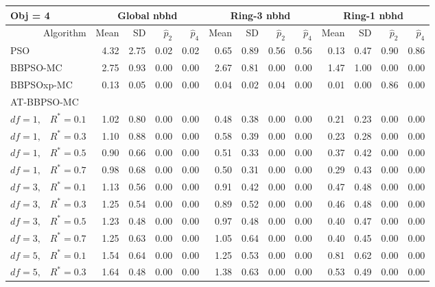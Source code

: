 \documentclass[12pt]{article}
\begin{document}
\begin{table}[ht]
\centering
\footnotesize{
\begin{tabular}{r|rrrr|rrrr|rrrr}
\multicolumn{1}{l}{Obj = 4} & \multicolumn{4}{c}{Global nbhd} & \multicolumn{4}{c}{Ring-3 nbhd} & \multicolumn{4}{c}{Ring-1 nbhd}\\
  \hline
Algorithm & Mean & SD & $\widehat{p}_2$ & $\widehat{p}_4$ & Mean & SD & $\widehat{p}_2$ & $\widehat{p}_4$ & Mean & SD & $\widehat{p}_2$ & $\widehat{p}_4$ \\ 
  \hline
\multicolumn{1}{l|}{PSO} & 4.32 & 2.75 & 0.02 & 0.02 & 0.65 & 0.89 & 0.56 & 0.56 & 0.13 & 0.47 & 0.90 & 0.86 \\ 
  \multicolumn{1}{l|}{BBPSO-MC} & 2.75 & 0.93 & 0.00 & 0.00 & 2.67 & 0.81 & 0.00 & 0.00 & 1.47 & 1.00 & 0.00 & 0.00 \\ 
  \multicolumn{1}{l|}{BBPSOxp-MC} & 0.13 & 0.05 & 0.00 & 0.00 & 0.04 & 0.02 & 0.04 & 0.00 & 0.01 & 0.00 & 0.86 & 0.00 \\ 
\hline
\multicolumn{1}{l|}{AT-BBPSO-MC} &&&&&&&&&&&&\\
  $df = 1,\enspace$ $R^* =0.1$ & 1.02 & 0.80 & 0.00 & 0.00 & 0.48 & 0.38 & 0.00 & 0.00 & 0.21 & 0.23 & 0.00 & 0.00 \\ 
  $df = 1,\enspace$ $R^* =0.3$ & 1.10 & 0.88 & 0.00 & 0.00 & 0.58 & 0.39 & 0.00 & 0.00 & 0.23 & 0.28 & 0.00 & 0.00 \\ 
  $df = 1,\enspace$ $R^* =0.5$ & 0.90 & 0.66 & 0.00 & 0.00 & 0.51 & 0.33 & 0.00 & 0.00 & 0.37 & 0.42 & 0.00 & 0.00 \\ 
  $df = 1,\enspace$ $R^* =0.7$ & 0.98 & 0.68 & 0.00 & 0.00 & 0.50 & 0.31 & 0.00 & 0.00 & 0.29 & 0.43 & 0.00 & 0.00 \\ 
  $df = 3,\enspace$ $R^* =0.1$ & 1.13 & 0.56 & 0.00 & 0.00 & 0.91 & 0.42 & 0.00 & 0.00 & 0.47 & 0.48 & 0.00 & 0.00 \\ 
  $df = 3,\enspace$ $R^* =0.3$ & 1.25 & 0.54 & 0.00 & 0.00 & 0.89 & 0.52 & 0.00 & 0.00 & 0.46 & 0.48 & 0.00 & 0.00 \\ 
  $df = 3,\enspace$ $R^* =0.5$ & 1.23 & 0.48 & 0.00 & 0.00 & 0.97 & 0.48 & 0.00 & 0.00 & 0.40 & 0.47 & 0.00 & 0.00 \\ 
  $df = 3,\enspace$ $R^* =0.7$ & 1.25 & 0.63 & 0.00 & 0.00 & 1.05 & 0.64 & 0.00 & 0.00 & 0.40 & 0.45 & 0.00 & 0.00 \\ 
  $df = 5,\enspace$ $R^* =0.1$ & 1.54 & 0.64 & 0.00 & 0.00 & 1.25 & 0.53 & 0.00 & 0.00 & 0.81 & 0.62 & 0.00 & 0.00 \\ 
  $df = 5,\enspace$ $R^* =0.3$ & 1.64 & 0.48 & 0.00 & 0.00 & 1.38 & 0.63 & 0.00 & 0.00 & 0.53 & 0.49 & 0.00 & 0.00 \\ 

\end{tabular}}
\end{table}
\end{document}
